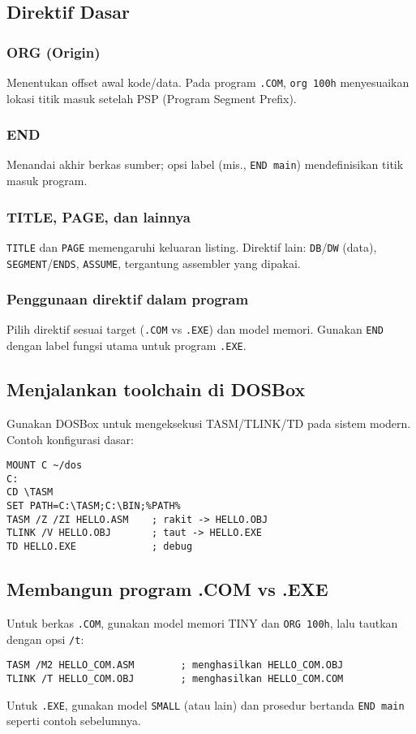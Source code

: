\subsection{Direktif Dasar}
\subsubsection{ORG (Origin)}
Menentukan offset awal kode/data. Pada program \texttt{.COM}, \texttt{org 100h} menyesuaikan lokasi titik masuk setelah PSP (Program Segment Prefix).

\subsubsection{END}
Menandai akhir berkas sumber; opsi label (mis., \texttt{END main}) mendefinisikan titik masuk program.

\subsubsection{TITLE, PAGE, dan lainnya}
\texttt{TITLE} dan \texttt{PAGE} memengaruhi keluaran listing. Direktif lain: \texttt{DB}/\texttt{DW} (data), \texttt{SEGMENT}/\texttt{ENDS}, \texttt{ASSUME}, tergantung assembler yang dipakai.

\subsubsection{Penggunaan direktif dalam program}
Pilih direktif sesuai target (\texttt{.COM} vs \texttt{.EXE}) dan model memori. Gunakan \texttt{END} dengan label fungsi utama untuk program \texttt{.EXE}.

\subsection{Menjalankan toolchain di DOSBox}
Gunakan DOSBox untuk mengeksekusi TASM/TLINK/TD pada sistem modern. Contoh konfigurasi dasar: \cite{dosbox_manual}
\begin{verbatim}
MOUNT C ~/dos
C:
CD \TASM
SET PATH=C:\TASM;C:\BIN;%PATH%
TASM /Z /ZI HELLO.ASM    ; rakit -> HELLO.OBJ
TLINK /V HELLO.OBJ       ; taut -> HELLO.EXE
TD HELLO.EXE             ; debug
\end{verbatim}

\subsection{Membangun program .COM vs .EXE}
Untuk berkas \texttt{.COM}, gunakan model memori TINY dan \texttt{ORG 100h}, lalu tautkan dengan opsi \texttt{/t}:
\begin{verbatim}
TASM /M2 HELLO_COM.ASM        ; menghasilkan HELLO_COM.OBJ
TLINK /T HELLO_COM.OBJ        ; menghasilkan HELLO_COM.COM
\end{verbatim}
Untuk \texttt{.EXE}, gunakan model \texttt{SMALL} (atau lain) dan prosedur bertanda \texttt{END main} seperti contoh sebelumnya. \cite{borland1990tasm}

